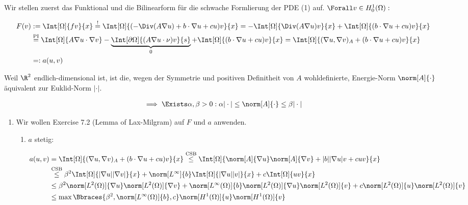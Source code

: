 \begin{solution}

Wir stellen zuerst das Funktional und die Bilinearform für die schwache Formlierung der PDE (1) auf.
$\Forall v \in H_0^1(\Omega):$

\begin{align*}
  F(v)
  & :=
  \Int[\Omega]{f v}{x}
  \stackrel{!}{=}
  \Int[\Omega]{(-\Div(A \nabla u) + b \cdot \nabla u + c u) v}{x}
  =
  -\Int[\Omega]{\Div(A \nabla u) v}{x}
  +
  \Int[\Omega]{(b \cdot \nabla u + c u) v}{x} \\
  & \stackrel
  {
    \mathrm{PI}
  }{=}
  \Int[\Omega]{A \nabla u \cdot \nabla v}
  -
  \underbrace
  {
    \Int[\partial \Omega]{(A \nabla u \cdot \nu) v}{s}
  }_0
  +
  \Int[\Omega]{(b \cdot \nabla u + c u) v}{x}
  =
  \Int[\Omega]{(\nabla u, \nabla v)_A + (b \cdot \nabla u + c u) v}{x} \\
  & =:
  a(u, v)
\end{align*}

Weil $\R^2$ endlich-dimensional ist, ist die, wegen der Symmetrie und positiven Definitheit von $A$ wohldefinierte, Energie-Norm $\norm[A]{\cdot}$ äquivalent zur Euklid-Norm $|\cdot|$.

\begin{align*}
  \implies
  \Exists \alpha, \beta > 0:
  \alpha |\cdot| \leq \norm[A]{\cdot} \leq \beta |\cdot|
\end{align*}

\begin{enumerate}[label = \textbf{\alph*)}]

  \item Wir wollen Exercise 7.2 (Lemma of Lax-Milgram) auf $F$ und $a$ anwenden.
  
  \begin{enumerate}[label = \arabic*.]

    \item $a$ stetig:
    
    \begin{align*}
      a(u, v)
      & =
      \Int[\Omega]{(\nabla u, \nabla v)_A + (b \cdot \nabla u + c u) v}{x}
      \stackrel
      {
        \mathrm{CSB}
      }{\leq}
      \Int[\Omega]{\norm[A]{\nabla u} \norm[A]{\nabla v} + |b| |\nabla u| v + c u v}{x} \\
      & \stackrel
      {
        \mathrm{CSB}
      }{\leq}
      \beta^2 \Int[\Omega]{|\nabla u| |\nabla v|}{x}
      +
      \norm[L^\infty]{b} \Int[\Omega]{|\nabla u| |v|}{x}
      +
      c \Int[\Omega]{u v}{x} \\
      & \leq
      \beta^2 \norm[L^2(\Omega)]{\nabla u} \norm[L^2(\Omega)]{\nabla v}
      +
      \norm[L^\infty(\Omega)]{b} \norm[L^2(\Omega)]{\nabla u} \norm[L^2(\Omega)]{v}
      +
      c \norm[L^2(\Omega)]{u} \norm[L^2(\Omega)]{v} \\
      & \leq
      \max \Bbraces{\beta^2, \norm[L^\infty(\Omega)]{b}, c} \norm[H^1(\Omega)]{u} \norm[H^1(\Omega)]{v}
    \end{align*}


\end{enumerate}
\end{enumerate}
\end{solution}
